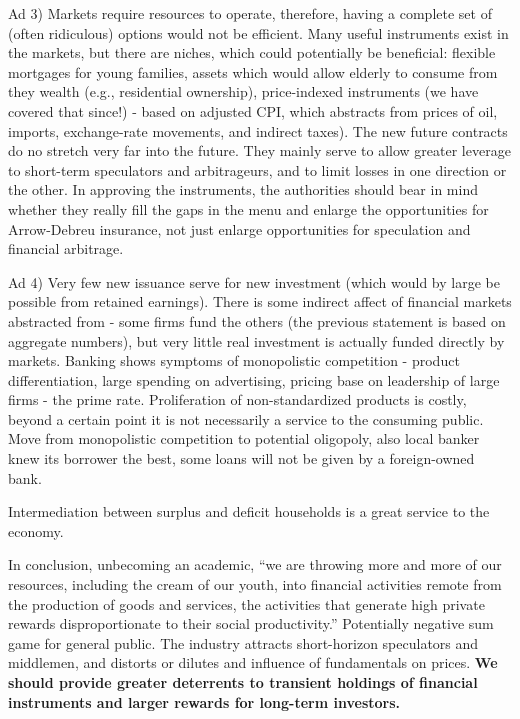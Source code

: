 \documentclass[a4paper,11pt]{article}
\begin{document}
Ad 3) Markets require resources to operate, therefore, having a complete set of (often ridiculous) options would not be efficient. Many useful instruments exist in the markets, but there are niches, which could potentially be beneficial: flexible mortgages for young families, assets which would allow elderly to consume from they wealth (e.g., residential ownership), price-indexed instruments (we have covered that since!) - based on adjusted CPI, which abstracts from prices of oil, imports, exchange-rate  movements, and indirect taxes). The new future contracts do no stretch very far into the future. They mainly serve to allow greater leverage to short-term speculators and arbitrageurs, and to limit losses in one direction or the other. In approving the instruments, the authorities should bear in mind whether they really fill the gaps in the menu and enlarge the opportunities for Arrow-Debreu insurance, not just enlarge opportunities for speculation and financial arbitrage. 

Ad 4) Very few new issuance serve for new investment (which would by large be possible from retained earnings). There is some indirect affect of financial markets abstracted from - some firms fund the others (the previous statement is based on aggregate numbers), but very little real investment is actually funded directly by markets. Banking shows symptoms of monopolistic competition - product differentiation, large spending on advertising, pricing base on leadership of large firms - the prime rate. Proliferation of non-standardized products is costly, beyond a certain point it is not necessarily a service to the consuming public. Move from monopolistic competition to potential oligopoly, also local banker knew its borrower the best, some loans will not be given by a foreign-owned bank.

Intermediation between surplus and deficit households is a great service to the economy. 

In conclusion, unbecoming an academic, ``we are throwing more and more of our resources, including the cream of our youth, into financial activities remote from the production of goods and services, the activities that generate high private rewards disproportionate to their social productivity.'' Potentially negative sum game for general public. The industry attracts short-horizon speculators and middlemen, and distorts or dilutes and influence of fundamentals on prices. \textbf{We should provide greater deterrents to transient holdings of financial instruments and larger rewards for long-term investors.}
\end{document}
